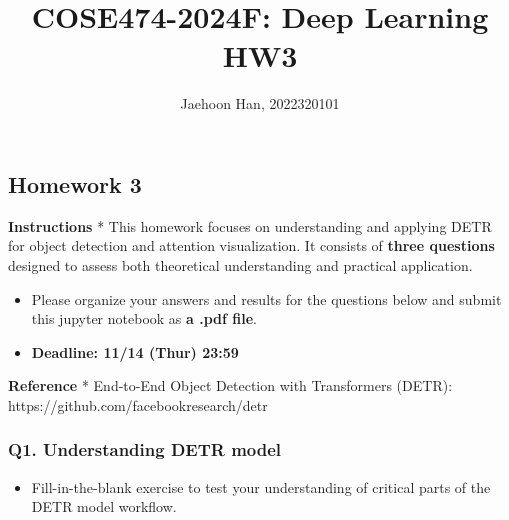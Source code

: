 \documentclass[11pt]{article}
\title{COSE474-2024F: Deep Learning HW3}
\author{Jaehoon Han, 2022320101}
\providecommand{\tightlist}{%
      \setlength{\itemsep}{0pt}\setlength{\parskip}{0pt}}
\begin{document}
    
    \maketitle
    
    

    
    \subsection*{\texorpdfstring{\textbf{Homework
3}}{Homework 3}}\label{homework-3}

\textbf{Instructions} * This homework focuses on understanding and
applying DETR for object detection and attention visualization. It
consists of \textbf{three questions} designed to assess both theoretical
understanding and practical application.

\begin{itemize}
\item
  Please organize your answers and results for the questions below and
  submit this jupyter notebook as \textbf{a .pdf file}.
\item
  \textbf{Deadline: 11/14 (Thur) 23:59}
\end{itemize}

\textbf{Reference} * End-to-End Object Detection with Transformers
(DETR): https://github.com/facebookresearch/detr

    \subsubsection*{\texorpdfstring{\textbf{Q1. Understanding DETR
model}}{Q1. Understanding DETR model}}\label{q1.-understanding-detr-model}

\begin{itemize}
\tightlist
\item
  Fill-in-the-blank exercise to test your understanding of critical
  parts of the DETR model workflow.
\end{itemize}
\end{document}
